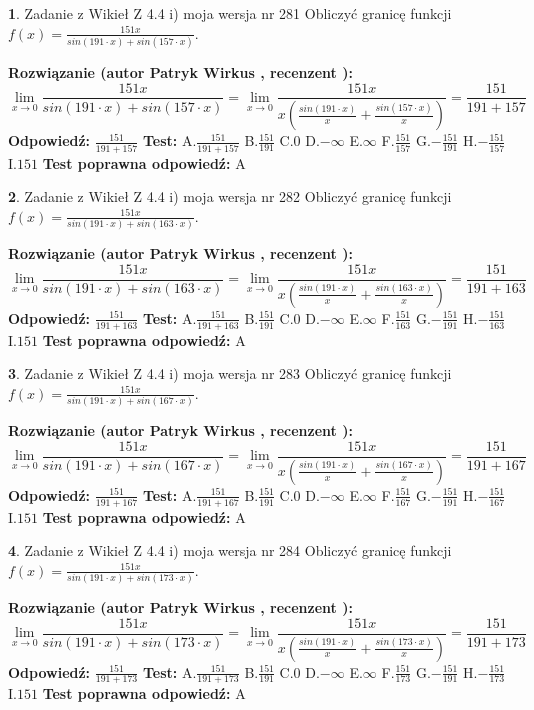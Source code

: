 \documentclass[12pt, a4paper]{article}
\theoremstyle{definition} %
\newtheorem{zad}{}
\newcommand{\zadStart}[1]{\begin{zad}#1\newline}
\newcommand{\zadStop}{\end{zad}}
\newcommand{\rozwStart}[2]{\noindent \textbf{Rozwiązanie (autor #1 , recenzent #2): }\newline}
\newcommand{\rozwStop}{\newline}
\newcommand{\odpStart}{\noindent \textbf{Odpowiedź:}\newline}
\newcommand{\odpStop}{\newline}
\newcommand{\testStart}{\noindent \textbf{Test:}\newline}
\newcommand{\testStop}{\newline}
\newcommand{\kluczStart}{\noindent \textbf{Test poprawna odpowiedź:}\newline}
\newcommand{\kluczStop}{\newline}
\begin{document}
\zadStart{Zadanie z Wikieł Z 4.4 i) moja wersja nr 281}
Obliczyć granicę funkcji $f(x)=\frac{151x}{sin(191\cdot x) +sin(157\cdot x)}$.
\zadStop
\rozwStart{Patryk Wirkus}{}
$$\lim\limits_{x\to 0}\frac{151x}{sin(191\cdot x) +sin(157\cdot x)}=\lim\limits_{x\to 0}\frac{151x}{x(\frac{sin(191\cdot x)}{x}+\frac{sin(157\cdot x)}{x})}=\frac{151}{191+157}$$
\rozwStop
\odpStart
$\frac{151}{191+157}$
\odpStop
\testStart
A.$\frac{151}{191+157}$
B.$\frac{151}{191}$
C.$0$
D.$-\infty$
E.$\infty$
F.$\frac{151}{157}$
G.$-\frac{151}{191}$
H.$-\frac{151}{157}$
I.$151$
\testStop
\kluczStart
A
\kluczStop



\zadStart{Zadanie z Wikieł Z 4.4 i) moja wersja nr 282}
Obliczyć granicę funkcji $f(x)=\frac{151x}{sin(191\cdot x) +sin(163\cdot x)}$.
\zadStop
\rozwStart{Patryk Wirkus}{}
$$\lim\limits_{x\to 0}\frac{151x}{sin(191\cdot x) +sin(163\cdot x)}=\lim\limits_{x\to 0}\frac{151x}{x(\frac{sin(191\cdot x)}{x}+\frac{sin(163\cdot x)}{x})}=\frac{151}{191+163}$$
\rozwStop
\odpStart
$\frac{151}{191+163}$
\odpStop
\testStart
A.$\frac{151}{191+163}$
B.$\frac{151}{191}$
C.$0$
D.$-\infty$
E.$\infty$
F.$\frac{151}{163}$
G.$-\frac{151}{191}$
H.$-\frac{151}{163}$
I.$151$
\testStop
\kluczStart
A
\kluczStop



\zadStart{Zadanie z Wikieł Z 4.4 i) moja wersja nr 283}
Obliczyć granicę funkcji $f(x)=\frac{151x}{sin(191\cdot x) +sin(167\cdot x)}$.
\zadStop
\rozwStart{Patryk Wirkus}{}
$$\lim\limits_{x\to 0}\frac{151x}{sin(191\cdot x) +sin(167\cdot x)}=\lim\limits_{x\to 0}\frac{151x}{x(\frac{sin(191\cdot x)}{x}+\frac{sin(167\cdot x)}{x})}=\frac{151}{191+167}$$
\rozwStop
\odpStart
$\frac{151}{191+167}$
\odpStop
\testStart
A.$\frac{151}{191+167}$
B.$\frac{151}{191}$
C.$0$
D.$-\infty$
E.$\infty$
F.$\frac{151}{167}$
G.$-\frac{151}{191}$
H.$-\frac{151}{167}$
I.$151$
\testStop
\kluczStart
A
\kluczStop



\zadStart{Zadanie z Wikieł Z 4.4 i) moja wersja nr 284}
Obliczyć granicę funkcji $f(x)=\frac{151x}{sin(191\cdot x) +sin(173\cdot x)}$.
\zadStop
\rozwStart{Patryk Wirkus}{}
$$\lim\limits_{x\to 0}\frac{151x}{sin(191\cdot x) +sin(173\cdot x)}=\lim\limits_{x\to 0}\frac{151x}{x(\frac{sin(191\cdot x)}{x}+\frac{sin(173\cdot x)}{x})}=\frac{151}{191+173}$$
\rozwStop
\odpStart
$\frac{151}{191+173}$
\odpStop
\testStart
A.$\frac{151}{191+173}$
B.$\frac{151}{191}$
C.$0$
D.$-\infty$
E.$\infty$
F.$\frac{151}{173}$
G.$-\frac{151}{191}$
H.$-\frac{151}{173}$
I.$151$
\testStop
\kluczStart
A
\kluczStop
\end{document}
